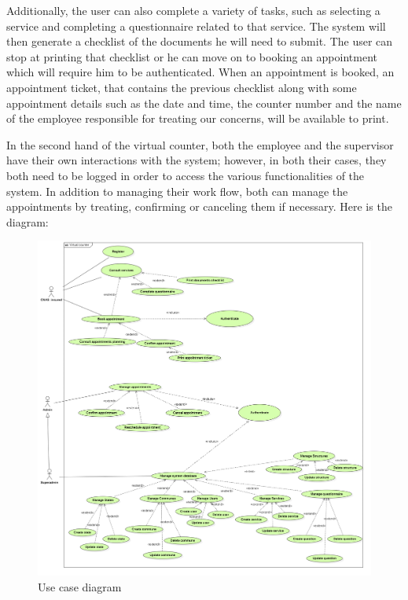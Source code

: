  Additionally, the user can also complete a variety of tasks, such as selecting a service and completing a questionnaire related to that service. The system will then generate a checklist of the documents he will need to submit. The user can stop at printing that checklist or he can move on to booking an appointment which will require him to be authenticated. When an appointment is booked, an appointment ticket, that contains the previous checklist along with some appointment details such as the date and time, the counter number and the name of the employee responsible for treating our concerns,  will be available to print. 
 
 \medskip In the second hand of the virtual counter, both the employee and the supervisor have their own interactions with the system; however, in both their cases, they both need to be logged in order to access the various functionalities of the system. In addition to managing their work flow, both can manage the appointments by treating, confirming or canceling them if necessary. 
\newpage
 \medskip Here is the diagram:

 \begin{figure}[H]
    \centering
    \includegraphics[width=1.0\textwidth]{usecase.PNG}
    \caption{Use case diagram}

    \label{ucdiagram}
 \end{figure}
 \newpage
